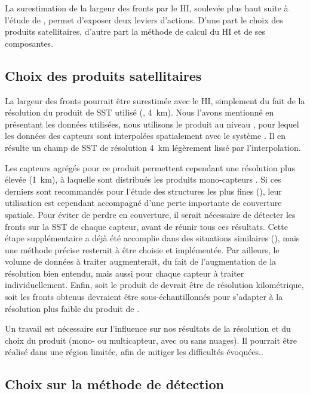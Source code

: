 La surestimation de la largeur des fronts par le HI, soulevée plus haut suite à l'étude de \textcite{mangolte_2023}, permet d'exposer deux leviers d'actions. D'une part le choix des produits satellitaires, d'autre part la méthode de calcul du HI et de ses composantes.

\subsection{Choix des produits satellitaires}

La largeur des fronts pourrait être surestimée avec le HI, simplement du fait de la résolution du produit de SST utilisé (, \qty{4}{\km}).
Nous l'avons mentionné en présentant les données utilisées, nous utilisons le produit  au niveau , pour lequel les données des capteurs sont interpolées spatialement avec le système .
Il en résulte un champ de SST de résolution \qty{4}{\km} légèrement lissé par l'interpolation.

Les capteurs agrégés pour ce produit permettent cependant une résolution plus élevée (\qty{1}{\km}), à laquelle sont distribués les produits mono-capteurs .
Si ces derniers sont recommandés pour l'étude des structures les plus fines (\cite{merchant_2019}), leur utilisation est cependant accompagné d'une perte importante de couverture spatiale.
Pour éviter de perdre en couverture, il serait nécessaire de détecter les fronts sur la SST de chaque capteur, avant de réunir tous ces résultats.
Cette étape supplémentaire a déjà été accomplie dans des situations similaires (\cite{miller_2009,nieto_2012}), mais une méthode précise resterait à être choisie et implémentée.
Par ailleurs, le volume de données à traiter augmenterait, du fait de l'augmentation de la résolution bien entendu, mais aussi pour chaque capteur à traiter individuellement.
Enfin, soit le produit de  devrait être de résolution kilométrique, soit les fronts obtenus devraient être sous-échantillonnés pour s'adapter à la résolution plus faible du produit de .

Un travail est nécessaire sur l'influence sur nos résultats de la résolution et du choix du produit (mono- ou multicapteur, avec ou sans nuages).
Il pourrait être réalisé dans une région limitée, afin de mitiger les difficultés évoquées..

\subsection{Choix sur la méthode de détection}

